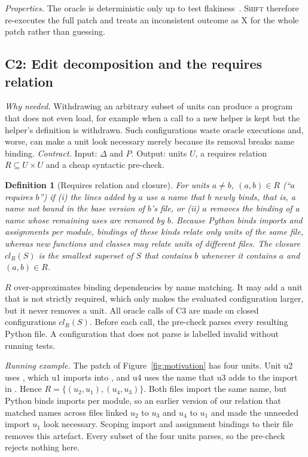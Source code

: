 \documentclass[a4paper,fleqn]{cas-sc}
\newcommand{\tool}{\textsc{Shift}}
\newcommand{\code}[1]{\texttt{\detokenize{#1}}}
\newcommand{\lab}[1]{\textsf{#1}}
\newtheorem{definition}{Definition}
\begin{document}
\emph{Properties.} The oracle is deterministic only up to test flakiness~\citep{luo2014flaky}. \tool{} therefore re-executes the full patch and treats an inconsistent outcome as \lab{X} for the whole patch rather than guessing.

\subsection{C2: Edit decomposition and the requires relation}\label{sec:decomp}
\emph{Why needed.} Withdrawing an arbitrary subset of units can produce a program that does not even load, for example when a call to a new helper is kept but the helper's definition is withdrawn. Such configurations waste oracle executions and, worse, can make a unit look necessary merely because its removal breaks name binding. \emph{Contract.} Input: $\Delta$ and $P$. Output: units $U$, a requires relation $R\subseteq U\times U$ and a cheap syntactic pre-check.

\begin{definition}[Requires relation and closure]\label{def:requires}
For units $a\neq b$, $(a,b)\in R$ (``$a$ requires $b$'') if (i) the lines added by $a$ use a name that $b$ newly binds, that is, a name not bound in the base version of $b$'s file, or (ii) $a$ removes the binding of a name whose remaining uses are removed by $b$. Because Python binds imports and assignments per module, bindings of these kinds relate only units of the same file, whereas new functions and classes may relate units of different files. The closure $\mathit{cl}_R(S)$ is the smallest superset of $S$ that contains $b$ whenever it contains $a$ and $(a,b)\in R$.
\end{definition}

$R$ over-approximates binding dependencies by name matching. It may add a unit that is not strictly required, which only makes the evaluated configuration larger, but it never removes a unit. All oracle calls of C3 are made on closed configurations $\mathit{cl}_R(S)$. Before each call, the pre-check parses every resulting Python file. A configuration that does not parse is labelled \lab{invalid} without running tests.

\emph{Running example.} The patch of Figure~\ref{fig:motivation} has four units. Unit u2 uses \code{LazyObject}, which u1 imports into \code{operations.py}, and u4 uses the name that u3 adds to the import in \code{fields/__init__.py}. Hence $R=\{(u_2,u_1),(u_4,u_3)\}$. Both files import the same name, but Python binds imports per module, so an earlier version of our relation that matched names across files linked $u_2$ to $u_3$ and $u_4$ to $u_1$ and made the unneeded import $u_1$ look necessary. Scoping import and assignment bindings to their file removes this artefact. Every subset of the four units parses, so the pre-check rejects nothing here.
\end{document}
